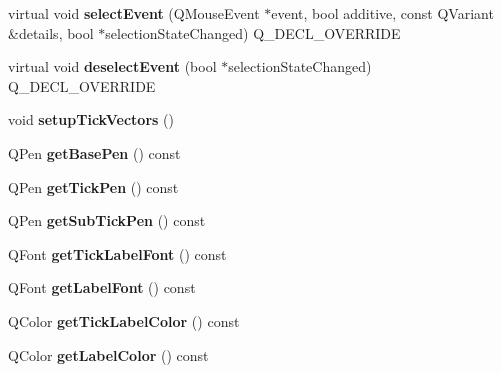 \begin{DoxyCompactItemize}
\item 
\mbox{\label{class_q_c_p_axis_aceb54231926cc65abecd638b2d125408}} 
virtual void {\bfseries select\+Event} (Q\+Mouse\+Event $\ast$event, bool additive, const Q\+Variant \&details, bool $\ast$selection\+State\+Changed) Q\+\_\+\+D\+E\+C\+L\+\_\+\+O\+V\+E\+R\+R\+I\+DE
\item 
\mbox{\label{class_q_c_p_axis_ad35767b1835603051691885296dee49e}} 
virtual void {\bfseries deselect\+Event} (bool $\ast$selection\+State\+Changed) Q\+\_\+\+D\+E\+C\+L\+\_\+\+O\+V\+E\+R\+R\+I\+DE
\item 
\mbox{\label{class_q_c_p_axis_a57d9e961bae7d62f5b4e1f143e660c78}} 
void {\bfseries setup\+Tick\+Vectors} ()
\item 
\mbox{\label{class_q_c_p_axis_a8cd3764c6a4ce9c3d7d913e81cad0a50}} 
Q\+Pen {\bfseries get\+Base\+Pen} () const
\item 
\mbox{\label{class_q_c_p_axis_afe7d57415cbbf31e5549a5cc40b6f8d8}} 
Q\+Pen {\bfseries get\+Tick\+Pen} () const
\item 
\mbox{\label{class_q_c_p_axis_aad7739c229b292ddab0b3a43a5676f54}} 
Q\+Pen {\bfseries get\+Sub\+Tick\+Pen} () const
\item 
\mbox{\label{class_q_c_p_axis_a694ab8b4240f3c90a866372e3dcb364f}} 
Q\+Font {\bfseries get\+Tick\+Label\+Font} () const
\item 
\mbox{\label{class_q_c_p_axis_aeac21c907d2516af9cde9a463043d671}} 
Q\+Font {\bfseries get\+Label\+Font} () const
\item 
\mbox{\label{class_q_c_p_axis_a8d00d5b78ecfbebbea5a8161bddb9a17}} 
Q\+Color {\bfseries get\+Tick\+Label\+Color} () const
\item 
\mbox{\label{class_q_c_p_axis_ae914abd56afa570cb9f2ab50e59c0f0e}} 
Q\+Color {\bfseries get\+Label\+Color} () const
\end{DoxyCompactItemize}

